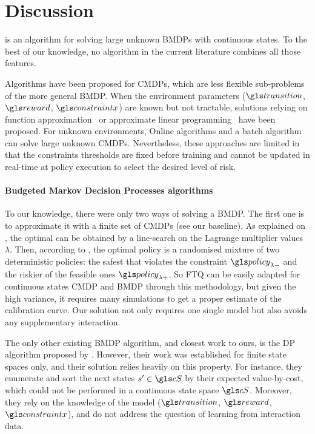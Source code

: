 \section*{Discussion}

 is an algorithm for solving large unknown \glspl{BMDP} with continuous states. To the best of our knowledge, no algorithm in the current literature combines all those features.

Algorithms have been proposed for \glspl{CMDP}, which are less flexible sub-problems of the more general \gls{BMDP}. When the environment parameters ($\Ps$, $\R$, $\constraint$) are known but not tractable, solutions relying on function approximation~\citep{Undurti2011} or approximate linear programming~\citep{Poupart2015} have been proposed. For unknown environments, Online algorithms \citep{Geibel2005, Abe2010,Achiam2017,Chow2018} and a batch algorithm \citep{Thomas2015, Ghavamzadeh2016, Laroche2019,Le2019} can solve large unknown \glspl{CMDP}. Nevertheless, these approaches are limited in that the constraints thresholds are fixed before training and cannot be updated in real-time at policy execution to select the desired level of risk.

\paragraph{Budgeted Markov Decision Processes algorithms}
To our knowledge, there were only two ways of solving a \gls{BMDP}. The first one is to approximate it with a finite set of \glspl{CMDP} (\eg see our \FTQl baseline). As explained on , the optimal  can be obtained by a line-search on the Lagrange multiplier values $\lambda$. Then, according to \citet[Theorem 4.4]{Beutler1985}, the optimal policy is a randomised mixture of two deterministic policies: the safest  that violates the constraint $\policy_{\lambda-}$ and the riskier of the feasible ones $\policy_{\lambda+}$. So \gls{FTQ} can be easily adapted for continuous states \gls{CMDP} and \gls{BMDP} through this methodology, but given the high variance, it requires many simulations to get a proper estimate of the calibration curve. Our solution not only requires one single model but also avoids any supplementary interaction.

The only other existing \gls{BMDP} algorithm, and closest work to ours, is the \gls{DP} algorithm proposed by \citet{Boutilier_Lu:uai16}. However, their work was established for finite state spaces only, and their solution relies heavily on this property. For instance, they enumerate and sort the next states $s'\in\cS$ by their expected value-by-cost, which could not be performed in a continuous state space $\cS$. Moreover, they rely on the knowledge of the model ($\Ps$, $\R$, $\constraint$), and do not address the question of learning from interaction data.


